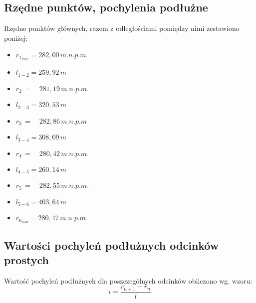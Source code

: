\documentclass[12pt]{article}
\begin{document}
    \subsection{Rzędne punktów, pochylenia podłużne}
        Rzędne punktów głównych, razem z odległościami pomiędzy nimi zestawiono poniżej:\\
        \begin{itemize}[noitemsep]                    \item \( r_{1_{Pocz}} = 282,00\,m.n.p.m. \)
            \item []  \qquad \qquad \qquad \qquad \qquad \qquad \( l_{1-2} = 259,92\,m \)
            \item \( r_{2} \, = \quad 281,19\,m.n.p.m. \)
            \item []  \qquad \qquad \qquad \qquad \qquad \qquad \( l_{2-3} = 320,53\,m \)
            \item \( r_{3} \, = \quad 282,86\,m.n.p.m \)
            \item []  \qquad \qquad \qquad \qquad \qquad \qquad \(l_{3-4} = 308,09\,m \)
            \item \( r_{4} \, = \quad 280,42\,m.n.p.m. \)
            \item []  \qquad \qquad \qquad \qquad \qquad \qquad \( l_{4-5} = 260,14\,m \)
            \item \( r_{5} \, = \quad 282,55\,m.n.p.m. \)
            \item []  \qquad \qquad \qquad \qquad \qquad \qquad \( l_{5-6} = 403,64\,m \)
            \item \( r_{6_{Kon}} = 280,47\,m.n.p.m. \)
        \end{itemize}

    \subsection{Wartości pochyleń podłużnych odcinków prostych}
        Wartość pochyleń podłużnych dla poszczególnych odcinków obliczono wg. wzoru:
        \begin{equation}
            i = \frac{r_{n+1} - r_{n}}{l}
        \end{equation}
\end{document}
